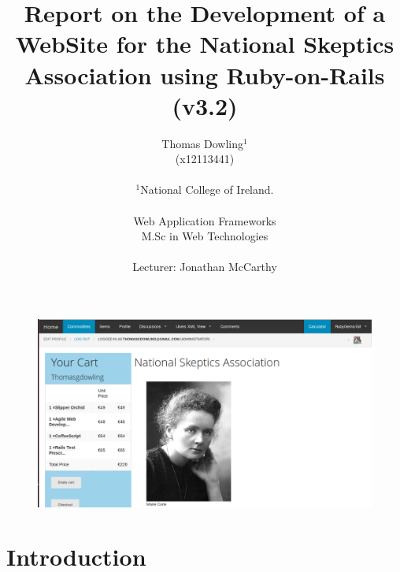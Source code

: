 \documentclass[11pt]{article}
\begin{document}
\begin{titlepage}

\title{
      Report on the Development of a WebSite for the National Skeptics Association using Ruby-on-Rails (v3.2)\\
        }   
\author{%
Thomas Dowling$^{1}$\\ 
(x12113441)\\\\
    $^{1}$National College of Ireland.\\ \\
	  Web Application Frameworks\\
	  M.Sc in Web Technologies\\\\
	  Lecturer: Jonathan McCarthy
	  }	
	
\maketitle
\vspace*{125px}
\begin{figure}[h!]
\centering
\includegraphics[scale=0.3]{./images/skepticsOne.png}
\end{figure}
\hypersetup{linkcolor=OliveGreen}
\clearpage
\tableofcontents

\end{titlepage}
\hypersetup{linkcolor=OliveGreen}

\hypertarget{label:sectMEINTRO}{ \section{Introduction}\label{label:meintro}}
\end{document}
